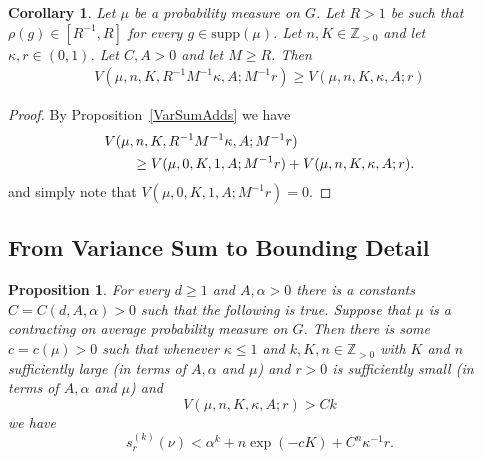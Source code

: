 \documentclass[10pt, english,oneside,reqno]{amsart}
\theoremstyle{plain}
\newtheorem{proposition}[theorem]{Proposition}
\newtheorem{corollary}[theorem]{Corollary}
\theoremstyle{remark}
\numberwithin{equation}{section}
\numberwithin{figure}{section}
\newcommand{\Z}{\mathbb{Z}}
\begin{document}
\begin{corollary} \label{ReScaleDecomposition}
    Let $\mu$ be a probability measure on $G$. Let $R > 1$ be such that $\rho(g) \in [R^{-1}, R]$ for every $g \in \mathrm{supp}(\mu)$. Let $n, K \in \mathbb{Z}_{> 0}$ and let $\kappa, r \in (0, 1)$. Let $C, A > 0$ and let $M \geq R$. Then
    \begin{align*}
        V(\mu, n, K, R^{-1} M^{-1} \kappa, A; M^{-1} r) \geq V(\mu, n, K, \kappa, A ; r)
    \end{align*}
\end{corollary}

\begin{proof}
    By Proposition~\ref{VarSumAdds} we have \begin{align*}
        \MoveEqLeft V(\mu,  n, K, R^{-1} M^{-1} \kappa , A; M^{-1}r) \\&\geq V(\mu, 0, K, 1, A; M^{-1}r) + V(\mu,  n , K, \kappa, A;  r).
    \end{align*} 
    and simply note that $V(\mu, 0, K, 1, A; M^{-1}r) = 0$.
\end{proof}

\subsection{From Variance Sum to Bounding Detail}\label{section:FromVariancetoDetail}

\begin{proposition} \label{DecompositionToDetail}
    For every $d\geq 1$ and $A, \alpha > 0$ there is a constants $C = C(d,A,\alpha) > 0$ such that the following is true. Suppose that $\mu$ is a contracting on average probability measure on $G$. Then there is some $c = c(\mu) > 0$ such that whenever $\kappa \leq 1$ and $k,K,n \in \Z_{>0}$ with $K$ and $n$ sufficiently large (in terms of $A, \alpha$ and $\mu$) and $r > 0$ is sufficiently small (in terms of $A, \alpha$ and $\mu$) and $$V(\mu, n,K, \kappa, A; r) > Ck$$ we have $$s_{r}^{(k)}(\nu) < \alpha^k + n\exp(-cK) + C^n\kappa^{-1}r.$$
\end{proposition}
\end{document}

